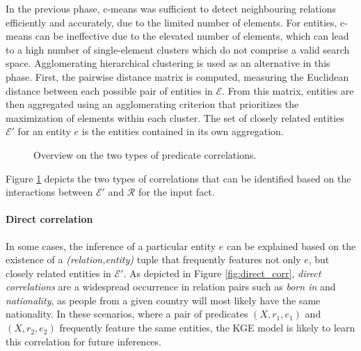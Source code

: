 In the previous phase, c-means was sufficient to detect neighbouring relations efficiently and accurately, due to the limited number of elements. For entities, c-means can be ineffective due to the elevated number of elements, which can lead to a high number of single-element clusters which do not comprise a valid search space. Agglomerating hierarchical clustering is used as an alternative in this phase. First, the pairwise distance matrix is computed, measuring the Euclidean distance between each possible pair of entities in $\mathcal{E}$. From this matrix, entities are then aggregated using an agglomerating criterion that prioritizes the maximization of elements within each cluster. The set of closely related entities $\mathcal{E}'$ for an entity $e$ is the entities contained in its own aggregation.

\begin{figure}[t!]
    \centering
    \qquad
    \caption{Overview on the two types of predicate correlations.}
    \label{fig:corr_overview}
\end{figure}

Figure \ref{fig:corr_overview} depicts the two types of correlations that can be identified based on the interactions between $\mathcal{E}'$ and $\mathcal{R}$ for the input fact.

\paragraph{Direct correlation}
In some cases, the inference of a particular entity $e$ can be explained based on the existence of a \textit{(relation,entity)} tuple that frequently features not only $e$, but closely related entities in $\mathcal{E}'$. As depicted in Figure \ref{fig:direct_corr}, \textit{direct correlations} are a widespread occurrence in relation pairs such as \textit{born in} and \textit{nationality}, as people from a given country will most likely have the same nationality. In these scenarios, where a pair of predicates $(X,r_1,e_1)$ and $(X,r_2,e_2)$ frequently feature the same entities, the KGE model is likely to learn this correlation for future inferences.

